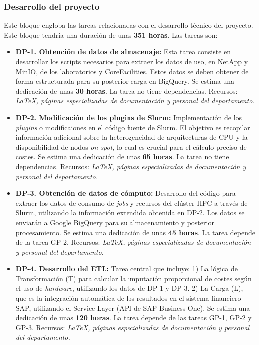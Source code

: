 \subsubsection{Desarrollo del proyecto}\label{ssec:Descripción de las tareas}
Este bloque engloba las tareas relacionadas con el desarrollo técnico del proyecto. Este bloque
tendría una duración de unas \textbf{351 horas}. Las tareas son:
\begin{itemize}
    \item \textbf{DP-1. Obtención de datos de almacenaje:} Esta tarea consiste en desarrollar 
    los scripts necesarios para extraer los datos de uso, en NetApp y MinIO, de los laboratorios
    y CoreFacilities. Estos datos se deben obtener de forma estructurada para su posterior carga 
    en BigQuery. Se estima una dedicación de unas \textbf{30 horas}.
    \newline La tarea no tiene dependencias.
    \newline Recursos: \textit {LaTeX, páginas especializadas de documentación y personal del departamento.}
    
    \item \textbf{DP-2. Modificación de los plugins de Slurm:} Implementación de los \textit{plugins} o modificaiones en el código fuente de Slurm. 
    El objetivo es recopilar información adicional 
    sobre la heterogeneidad de arquitecturas de CPU y la disponibilidad de nodos \textit{on spot}, lo cual es crucial para el cálculo preciso de costes. 
    Se estima una dedicación de unas \textbf{65 horas}.
    \newline La tarea no tiene dependencias.
    \newline Recursos: \textit {LaTeX, páginas especializadas de documentación y personal del departamento.}
    
    \item \textbf{DP-3. Obtención de datos de cómputo:} Desarrollo del código para extraer los datos de consumo de \textit{jobs} y recursos del clúster HPC 
    a través de Slurm, utilizando la información extendida obtenida en DP-2. Los datos se enviarán a Google BigQuery para su almacenamiento 
    y posterior procesamiento. Se estima una dedicación de unas \textbf{45 horas}.
    \newline La tarea depende de la tarea GP-2.
    \newline Recursos: \textit {LaTeX, páginas especializadas de documentación y personal del departamento.}
    
    \item \textbf{DP-4. Desarrollo del ETL:}  Tarea central que incluye: 1) La lógica de Transformación (T) para calcular la imputación proporcional de costes 
    según el uso de \textit{hardware}, utilizando los datos de DP-1 y DP-3. 2) La Carga (L), que es la integración automática de los resultados en el sistema 
    financiero SAP, utilizando el Service Layer (API de SAP Business One). Se estima una dedicación de unas \textbf{120 horas}.
    \newline La tarea depende de las tareas GP-1, GP-2 y GP-3.
    \newline Recursos: \textit {LaTeX, páginas especializadas de documentación y personal del departamento.}
    

\end{itemize}
